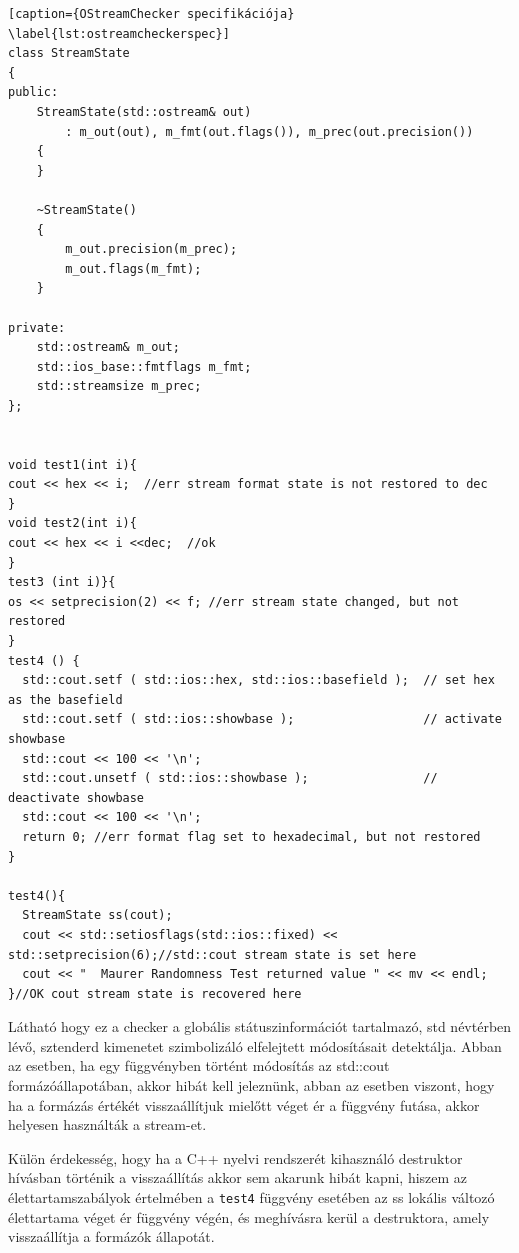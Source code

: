 \documentclass[a4paper,12pt]{report}
\begin{document}
\begin{lstlisting}[caption={OStreamChecker specifikációja}
\label{lst:ostreamcheckerspec}]
class StreamState
{
public:
    StreamState(std::ostream& out)
        : m_out(out), m_fmt(out.flags()), m_prec(out.precision())
    {
    }

    ~StreamState()
    {
        m_out.precision(m_prec);
        m_out.flags(m_fmt);
    }

private:
    std::ostream& m_out;
    std::ios_base::fmtflags m_fmt;
    std::streamsize m_prec;
};


void test1(int i){
cout << hex << i;  //err stream format state is not restored to dec
}
void test2(int i){
cout << hex << i <<dec;  //ok
}
test3 (int i)}{
os << setprecision(2) << f; //err stream state changed, but not restored
}
test4 () {
  std::cout.setf ( std::ios::hex, std::ios::basefield );  // set hex as the basefield
  std::cout.setf ( std::ios::showbase );                  // activate showbase
  std::cout << 100 << '\n';
  std::cout.unsetf ( std::ios::showbase );                // deactivate showbase
  std::cout << 100 << '\n';
  return 0; //err format flag set to hexadecimal, but not restored
}

test4(){
  StreamState ss(cout);
  cout << std::setiosflags(std::ios::fixed) << std::setprecision(6);//std::cout stream state is set here
  cout << "  Maurer Randomness Test returned value " << mv << endl;
}//OK cout stream state is recovered here
\end{lstlisting}

Látható hogy ez a checker a globális státuszinformációt tartalmazó, std névtérben lévő, sztenderd kimenetet szimbolizáló elfelejtett módosításait detektálja. Abban az esetben, ha egy függvényben történt módosítás az std::cout formázóállapotában, akkor hibát kell jeleznünk, abban az esetben viszont, hogy ha a formázás értékét visszaállítjuk mielőtt véget ér a függvény futása, akkor helyesen használták a stream-et.

Külön érdekesség, hogy ha a C++ nyelvi rendszerét kihasználó destruktor hívásban történik a visszaállítás akkor sem akarunk hibát kapni, hiszem az élettartamszabályok értelmében a \texttt{test4} függvény esetében az ss lokális változó élettartama véget ér függvény végén, és meghívásra kerül a destruktora, amely visszaállítja a formázók állapotát.
\end{document}
